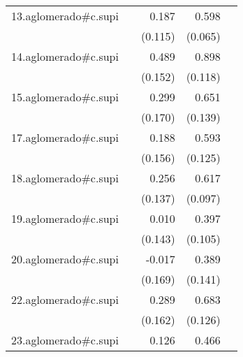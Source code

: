 {\begin{longtable}{l*{4}{D{.}{.}{-1}}}
\addlinespace
13.aglomerado#c.supi&                     &       0.187         &       0.598\sym{***}&                     \\
            &                     &     (0.115)         &     (0.065)         &                     \\
\addlinespace
14.aglomerado#c.supi&                     &       0.489\sym{**} &       0.898\sym{***}&                     \\
            &                     &     (0.152)         &     (0.118)         &                     \\
\addlinespace
15.aglomerado#c.supi&                     &       0.299         &       0.651\sym{***}&                     \\
            &                     &     (0.170)         &     (0.139)         &                     \\
\addlinespace
17.aglomerado#c.supi&                     &       0.188         &       0.593\sym{***}&                     \\
            &                     &     (0.156)         &     (0.125)         &                     \\
\addlinespace
18.aglomerado#c.supi&                     &       0.256         &       0.617\sym{***}&                     \\
            &                     &     (0.137)         &     (0.097)         &                     \\
\addlinespace
19.aglomerado#c.supi&                     &       0.010         &       0.397\sym{***}&                     \\
            &                     &     (0.143)         &     (0.105)         &                     \\
\addlinespace
20.aglomerado#c.supi&                     &      -0.017         &       0.389\sym{**} &                     \\
            &                     &     (0.169)         &     (0.141)         &                     \\
\addlinespace
22.aglomerado#c.supi&                     &       0.289         &       0.683\sym{***}&                     \\
            &                     &     (0.162)         &     (0.126)         &                     \\
\addlinespace
23.aglomerado#c.supi&                     &       0.126         &       0.466\sym{***}&                     \\

\end{longtable}}
